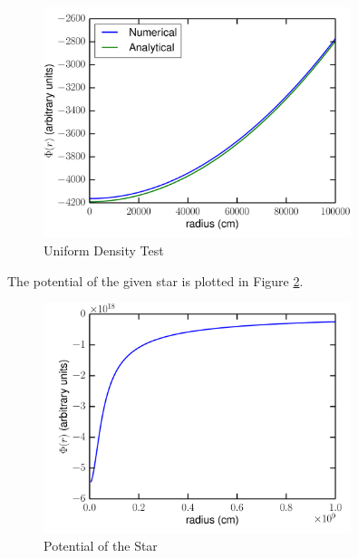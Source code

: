 \documentclass[11pt,letterpaper]{article}
\begin{document}
\begin{figure}[bth]
\centering
\includegraphics[width={0.8\textwidth}]{fig2.pdf} 
\caption{Uniform Density Test}
\label{fig2}
\end{figure}

The potential of the given star is plotted in Figure \ref{fig3}.

\begin{figure}[bth]
\centering
\includegraphics[width={0.8\textwidth}]{fig3.pdf} 
\caption{Potential of the Star}
\label{fig3}
\end{figure}
\end{document}
